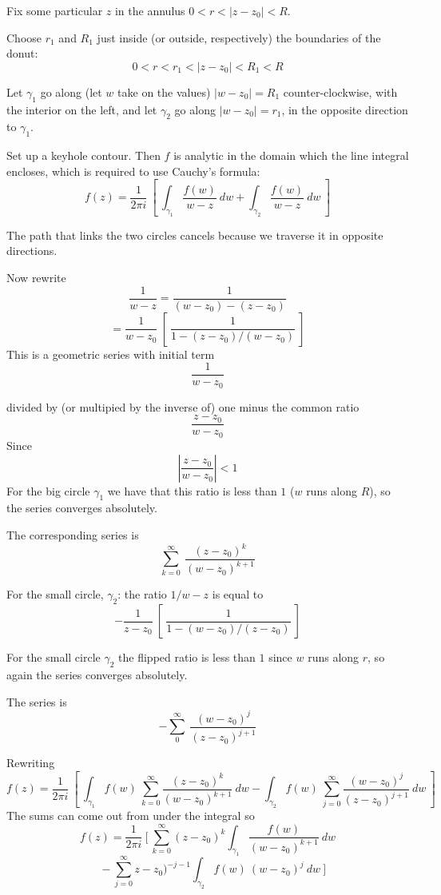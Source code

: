 \documentclass[11pt, oneside]{article}
\begin{document}
Fix some particular $z$ in the annulus $0 < r < |z-z_0| < R$.

Choose $r_1$ and $R_1$ just inside (or outside, respectively) the boundaries of the donut:
\[ 0 < r < r_1 < |z-z_0| < R_1 < R \]

Let $\gamma_1$ go along (let $w$ take on the values) $|w - z_0| = R_1$ counter-clockwise, with the interior on the left, and let $\gamma_2$ go along $|w - z_0| = r_1$, in the opposite direction to $\gamma_1$.  

Set up a keyhole contour.  Then $f$ is analytic in the domain which the line integral encloses, which is required to use Cauchy's formula:
\[ f(z) = \frac{1}{2 \pi i} \ [ \ \int_{\gamma_1} \frac{f(w)}{w-z} \ dw +  \int_{\gamma_2} \frac{f(w)}{w-z} \ dw \ ]  \]

The path that links the two circles cancels because we traverse it in opposite directions.

Now rewrite 
\[ \frac{1}{w - z} = \frac{1}{(w - z_0) - (z - z_0)} \]
\[ = \frac{1}{w - z_0} \ [ \ \frac{1}{1 - (z-z_0)/(w-z_0)} \ ] \]
This is a geometric series with initial term
\[ \frac{1}{w - z_0} \]

divided by (or multipied by the inverse of) one minus the common ratio
\[ \frac{z-z_0}{w - z_0} \]
Since 
\[ | \frac{z - z_0}{w - z_0} | < 1 \]
For the big circle $\gamma_1$ we have that this ratio is less than $1$ ($w$ runs along $R$), so the series converges absolutely.

The corresponding series is
\[ \sum_{k=0}^{\infty} \ \frac{(z - z_0)^k}{(w - z_0)^{k+1}} \]

For the small circle, $\gamma_2$:
the ratio $1/w-z$ is equal to
\[ -\frac{1}{z - z_0} \ [ \ \frac{1}{1 - (w-z_0)/(z-z_0)} \ ] \]

For the small circle $\gamma_2$ the flipped ratio is less than $1$ since $w$ runs along $r$, so again the series converges absolutely.  

The series is
\[ - \sum_0^{\infty} \ \frac{(w - z_0)^j}{(z - z_0)^{j+1}} \]

Rewriting 
\[ f(z) = \frac{1}{2 \pi i} \ [ \ \int_{\gamma_1} f(w) \ \sum_{k=0}^{\infty} \frac{(z - z_0)^k}{(w - z_0)^{k+1}} \ dw - \int_{\gamma_2} f(w) \ \sum_{j=0}^{\infty} \frac{(w - z_0)^j}{(z - z_0)^{j+1}} \ dw \ ] \]
The sums can come out from under the integral so
\[ f(z) = \frac{1}{2 \pi i} \ [ \ \sum_{k=0}^{\infty} (z - z_0)^k \int_{\gamma_1} \frac{f(w)}{(w - z_0)^{k+1}} \ dw  \]
\[ \ \ \ \ - \sum_{j=0}^{\infty} z - z_0)^{-j-1} \int_{\gamma_2} f(w) \ (w - z_0)^{j}  \ dw \ ]  \]
\end{document}
